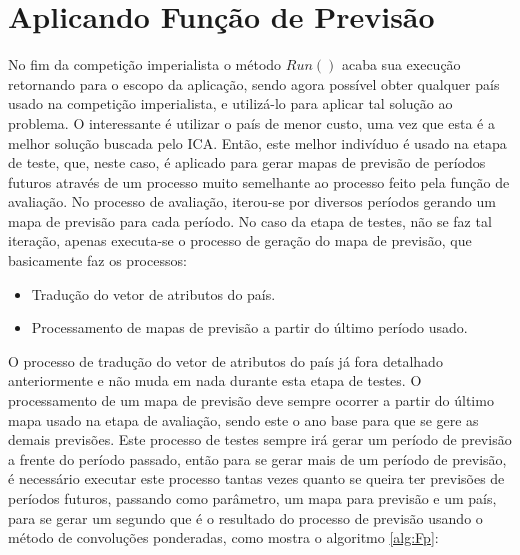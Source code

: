 \section{Aplicando Função de Previsão}
\label{A Etapa de Previsão}

No fim da competição imperialista o método \(Run()\) acaba sua execução retornando para o escopo da aplicação, sendo agora possível obter qualquer país usado na competição imperialista, e utilizá-lo para aplicar tal solução ao problema. O interessante é utilizar o país de menor custo, uma vez que esta é a melhor solução buscada pelo ICA. Então, este melhor indivíduo é usado na etapa de teste, que, neste caso, é aplicado para gerar mapas de previsão de períodos futuros através de um processo muito semelhante ao processo feito pela função de avaliação. No processo de avaliação, iterou-se por diversos períodos gerando um mapa de previsão para cada período. No caso da etapa de testes, não se faz tal iteração, apenas executa-se o processo de geração do mapa de previsão, que basicamente faz os processos:

\begin{itemize}
	\item Tradução do vetor de atributos do país.
	\item Processamento de mapas de previsão a partir do último período usado.
\end{itemize}

O processo de tradução do vetor de atributos do país já fora detalhado anteriormente e não muda em nada durante esta etapa de testes. O processamento de um mapa de previsão deve sempre ocorrer a partir do último mapa usado na etapa de avaliação, sendo este o ano base para que se gere as demais previsões. Este processo de testes sempre irá gerar um período de previsão a frente do período passado, então para se gerar mais de um período de previsão, é necessário executar este processo tantas vezes quanto se queira ter previsões de períodos futuros, passando como parâmetro, um mapa para previsão e um país, para se gerar um segundo que é o resultado do processo de previsão usando o método de convoluções ponderadas, como mostra o algoritmo \ref{alg:Fp}:

